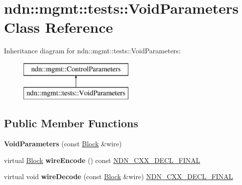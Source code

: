 \hypertarget{classndn_1_1mgmt_1_1tests_1_1VoidParameters}{}\section{ndn\+:\+:mgmt\+:\+:tests\+:\+:Void\+Parameters Class Reference}
\label{classndn_1_1mgmt_1_1tests_1_1VoidParameters}
Inheritance diagram for ndn\+:\+:mgmt\+:\+:tests\+:\+:Void\+Parameters\+:\begin{figure}[H]
\begin{center}
\leavevmode
\includegraphics[height=2.000000cm]{classndn_1_1mgmt_1_1tests_1_1VoidParameters}
\end{center}
\end{figure}
\subsection*{Public Member Functions}
\begin{DoxyCompactItemize}
\item 
{\bfseries Void\+Parameters} (const \hyperlink{classndn_1_1Block}{Block} \&wire)\hypertarget{classndn_1_1mgmt_1_1tests_1_1VoidParameters_aa8a43faab56dccb9278f32a708de8c84}{}\label{classndn_1_1mgmt_1_1tests_1_1VoidParameters_aa8a43faab56dccb9278f32a708de8c84}

\item 
virtual \hyperlink{classndn_1_1Block}{Block} {\bfseries wire\+Encode} () const \hyperlink{ndn-cxx_2src_2common_8hpp_ab53a383abb72682805543301b5f2c244}{N\+D\+N\+\_\+\+C\+X\+X\+\_\+\+D\+E\+C\+L\+\_\+\+F\+I\+N\+AL}\hypertarget{classndn_1_1mgmt_1_1tests_1_1VoidParameters_aabf3c167e4f18817581bf9d21fa36208}{}\label{classndn_1_1mgmt_1_1tests_1_1VoidParameters_aabf3c167e4f18817581bf9d21fa36208}

\item 
virtual void {\bfseries wire\+Decode} (const \hyperlink{classndn_1_1Block}{Block} \&wire) \hyperlink{ndn-cxx_2src_2common_8hpp_ab53a383abb72682805543301b5f2c244}{N\+D\+N\+\_\+\+C\+X\+X\+\_\+\+D\+E\+C\+L\+\_\+\+F\+I\+N\+AL}\hypertarget{classndn_1_1mgmt_1_1tests_1_1VoidParameters_a60e97649e31840c939940b65885ddff2}{}\label{classndn_1_1mgmt_1_1tests_1_1VoidParameters_a60e97649e31840c939940b65885ddff2}

\end{DoxyCompactItemize}


